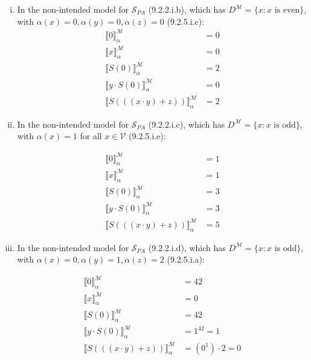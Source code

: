 \begin{enumerate}[\thesection.1]
\begin{enumerate}[(i)]
			\item In the non-intended model for $\mathcal{S}_{PA}$ (9.2.2.i.b), which has $D^\mathcal{M}=\{x:x\text{ is even}\}$, with $\alpha(x)=0,\alpha(y)=0,\alpha(z)=0$ (9.2.5.i.c):
			\begin{align*}
			\llbracket 0\rrbracket^\mathcal{M}_\alpha&=0\\
			\llbracket x\rrbracket^\mathcal{M}_\alpha&=0\\
			\llbracket S(0)\rrbracket^\mathcal{M}_\alpha&=2\\
			\llbracket y\cdot S(0)\rrbracket^\mathcal{M}_\alpha&=0\\
			\llbracket S(((x\cdot y)+z))\rrbracket^\mathcal{M}_\alpha&=2
			\end{align*}
			
			\item In the non-intended model for $\mathcal{S}_{PA}$ (9.2.2.i.c), which has $D^\mathcal{M}=\{x:x\text{ is odd}\}$, with $\alpha(x)=1$ for all $x\in\mathcal{V}$ (9.2.5.i.e):
			
			\begin{align*}
			\llbracket 0\rrbracket^\mathcal{M}_\alpha&=1\\
			\llbracket x\rrbracket^\mathcal{M}_\alpha&=1\\
			\llbracket S(0)\rrbracket^\mathcal{M}_\alpha&=3\\
			\llbracket y\cdot S(0)\rrbracket^\mathcal{M}_\alpha&=3\\
			\llbracket S(((x\cdot y)+z))\rrbracket^\mathcal{M}_\alpha&=5
			\end{align*}
			
			\item In the non-intended model for $\mathcal{S}_{PA}$ (9.2.2.i.d), which has $D^\mathcal{M}=\{x:x\text{ is odd}\}$, with $\alpha(x)=0,\alpha(y)=1,\alpha(z)=2$ (9.2.5.i.a):
			
			\begin{align*}
			\llbracket 0\rrbracket^\mathcal{M}_\alpha&=42\\
			\llbracket x\rrbracket^\mathcal{M}_\alpha&=0\\
			\llbracket S(0)\rrbracket^\mathcal{M}_\alpha&=42\\
			\llbracket y\cdot S(0)\rrbracket^\mathcal{M}_\alpha&=1^{42}=1\\
			\llbracket S(((x\cdot y)+z))\rrbracket^\mathcal{M}_\alpha&=(0^1)\cdot 2=0
			\end{align*}
			

\end{enumerate}
\end{enumerate}
